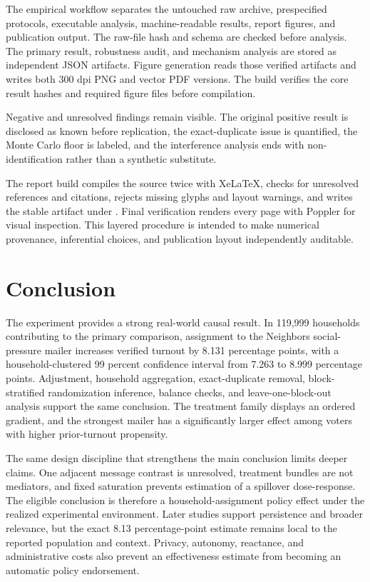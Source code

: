 \documentclass[a4paper,12pt]{article}
\begin{document}
The empirical workflow separates the untouched raw archive, prespecified protocols, executable analysis, machine-readable results, report figures, and publication output. The raw-file hash and schema are checked before analysis. The primary result, robustness audit, and mechanism analysis are stored as independent JSON artifacts. Figure generation reads those verified artifacts and writes both 300 dpi PNG and vector PDF versions. The build verifies the core result hashes and required figure files before compilation.

Negative and unresolved findings remain visible. The original positive result is disclosed as known before replication, the exact-duplicate issue is quantified, the Monte Carlo floor is labeled, and the interference analysis ends with non-identification rather than a synthetic substitute.

The report build compiles the source twice with XeLaTeX, checks for unresolved references and citations, rejects missing glyphs and layout warnings, and writes the stable artifact under . Final verification renders every page with Poppler for visual inspection. This layered procedure is intended to make numerical provenance, inferential choices, and publication layout independently auditable.

\section{Conclusion}

The experiment provides a strong real-world causal result. In 119,999 households contributing to the primary comparison, assignment to the Neighbors social-pressure mailer increases verified turnout by 8.131 percentage points, with a household-clustered 99 percent confidence interval from 7.263 to 8.999 percentage points. Adjustment, household aggregation, exact-duplicate removal, block-stratified randomization inference, balance checks, and leave-one-block-out analysis support the same conclusion. The treatment family displays an ordered gradient, and the strongest mailer has a significantly larger effect among voters with higher prior-turnout propensity.

The same design discipline that strengthens the main conclusion limits deeper claims. One adjacent message contrast is unresolved, treatment bundles are not mediators, and fixed saturation prevents estimation of a spillover dose-response. The eligible conclusion is therefore a household-assignment policy effect under the realized experimental environment. Later studies support persistence and broader relevance, but the exact 8.13 percentage-point estimate remains local to the reported population and context. Privacy, autonomy, reactance, and administrative costs also prevent an effectiveness estimate from becoming an automatic policy endorsement.
\end{document}
